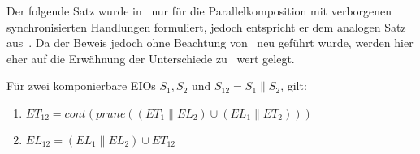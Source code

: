 Der folgende Satz wurde in~\cite{Vogler2014EIO} nur für die Parallelkomposition
mit verborgenen synchronisierten Handlungen formuliert, jedoch entspricht er dem
analogen Satz aus~\cite{Schlosser2012BA}. Da der Beweis jedoch ohne Beachtung
von~\cite{Schlosser2012BA} neu geführt wurde, werden hier eher auf die
Erwähnung der Unterschiede zu~\cite{Vogler2014EIO} wert gelegt.

\begin{satz}
  \label{satzErrorSemanik}
  Für zwei komponierbare EIOs $S_1, S_2$ und $S_{12}=S_1\|S_2$, gilt:
  \begin{enumerate}
    \item $ET_{12}=cont(prune((ET_1\|EL_2)\cup(EL_1\|ET_2)))$
    \item $EL_{12}=(EL_1\|EL_2)\cup ET_{12}$
  \end{enumerate}
\end{satz}


